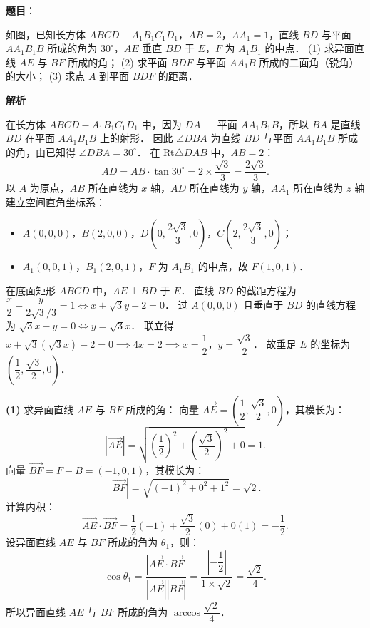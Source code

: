 \begin{answer}

\textbf{题目}：

如图，已知长方体 $ABCD - A_1B_1C_1D_1$，$AB = 2$，$AA_1 = 1$，直线 $BD$ 与平面 $AA_1B_1B$ 所成的角为 $30^\circ$，$AE$ 垂直 $BD$ 于 $E$，$F$ 为 $A_1B_1$ 的中点．
(1) 求异面直线 $AE$ 与 $BF$ 所成的角；
(2) 求平面 $BDF$ 与平面 $AA_1B$ 所成的二面角（锐角）的大小；
(3) 求点 $A$ 到平面 $BDF$ 的距离．
\nopagebreak[4]
\begin{center}\end{center}
\nopagebreak[4]
\textbf{解析}

在长方体 $ABCD - A_1B_1C_1D_1$ 中，因为 $DA \perp$ 平面 $AA_1B_1B$，所以 $BA$ 是直线 $BD$ 在平面 $AA_1B_1B$ 上的射影．
因此 $\angle DBA$ 为直线 $BD$ 与平面 $AA_1B_1B$ 所成的角，由已知得 $\angle DBA = 30^\circ$．
在 Rt$\triangle DAB$ 中，$AB = 2$：
\nopagebreak[4]
\[
AD = AB \cdot \tan 30^\circ = 2 \times \dfrac{\sqrt{3}}{3} = \dfrac{2\sqrt{3}}{3}.
\]
以 $A$ 为原点，$AB$ 所在直线为 $x$ 轴，$AD$ 所在直线为 $y$ 轴，$AA_1$ 所在直线为 $z$ 轴建立空间直角坐标系：
\begin{itemize}
\item $A(0, 0, 0)$，$B(2, 0, 0)$，$D\left(0, \dfrac{2\sqrt{3}}{3}, 0\right)$，$C\left(2, \dfrac{2\sqrt{3}}{3}, 0\right)$；
\item $A_1(0, 0, 1)$，$B_1(2, 0, 1)$，$F$ 为 $A_1B_1$ 的中点，故 $F(1, 0, 1)$．
\end{itemize}

在底面矩形 $ABCD$ 中，$AE \perp BD$ 于 $E$．
直线 $BD$ 的截距方程为 $\dfrac{x}{2} + \dfrac{y}{2\sqrt{3}/3} = 1 \iff x + \sqrt{3}y - 2 = 0$．
过 $A(0, 0, 0)$ 且垂直于 $BD$ 的直线方程为 $\sqrt{3}x - y = 0 \iff y = \sqrt{3}x$．
联立得 $x + \sqrt{3}(\sqrt{3}x) - 2 = 0 \implies 4x = 2 \implies x = \dfrac{1}{2}$，$y = \dfrac{\sqrt{3}}{2}$．
故垂足 $E$ 的坐标为 $\left(\dfrac{1}{2}, \dfrac{\sqrt{3}}{2}, 0\right)$．

\textbf{(1)}
求异面直线 $AE$ 与 $BF$ 所成的角：
向量 $\vec{AE} = \left(\dfrac{1}{2}, \dfrac{\sqrt{3}}{2}, 0\right)$，其模长为：
\nopagebreak[4]
\[
|\vec{AE}| = \sqrt{\left(\dfrac{1}{2}\right)^2 + \left(\dfrac{\sqrt{3}}{2}\right)^2 + 0} = 1.
\]
向量 $\vec{BF} = F - B = (-1, 0, 1)$，其模长为：
\nopagebreak[4]
\[
|\vec{BF}| = \sqrt{(-1)^2 + 0^2 + 1^2} = \sqrt{2}.
\]
计算内积：
\nopagebreak[4]
\[
\vec{AE} \cdot \vec{BF} = \dfrac{1}{2}(-1) + \dfrac{\sqrt{3}}{2}(0) + 0(1) = -\dfrac{1}{2}.
\]
设异面直线 $AE$ 与 $BF$ 所成的角为 $\theta_1$，则：
\nopagebreak[4]
\[
\cos\theta_1 = \dfrac{|\vec{AE} \cdot \vec{BF}|}{|\vec{AE}| |\vec{BF}|} = \dfrac{\left|-\dfrac{1}{2}\right|}{1 \times \sqrt{2}} = \dfrac{\sqrt{2}}{4}.
\]
所以异面直线 $AE$ 与 $BF$ 所成的角为 $\arccos\dfrac{\sqrt{2}}{4}$．


\end{answer}
